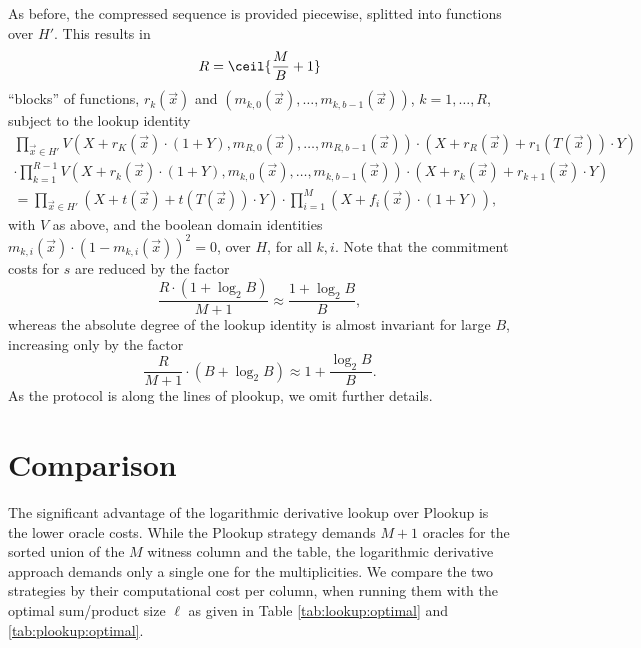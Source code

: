 \documentclass[11pt]{article}
\theoremstyle{definition}
\theoremstyle{definition}
\begin{document}
As before, the compressed sequence is provided piecewise, splitted into functions over $H'$. 
This results in
\[
R = \ceil{\frac{M}{B}+ 1} 
\]
``blocks'' of functions, $r_k(\vec x)$ and $( m_{k,0}(\vec x),\ldots,  m_{k, b-1}(\vec x))$, $k=1,\ldots, R$, subject to 
the lookup identity
\begin{multline*}
\prod_{\vec x\in H'} 
V(X +  r_K(\vec x) \cdot (1 + Y), m_{R,0}(\vec x),\ldots, m_{R,b-1}(\vec x)) \cdot (X +  r_{R}(\vec x) +  r_{1}(T(\vec x))\cdot Y)
\\
\cdot 
\prod_{k=1}^{R-1}
V(X +  r_k(\vec x) \cdot (1 + Y), m_{k,0}(\vec x),\ldots, m_{k,b-1}(\vec x)) \cdot (X +  r_{k}(\vec x) +  r_{k+1}(\vec x)\cdot Y)
\\
= \prod_{\vec x\in H'} (X + t(\vec x) + t(T(\vec x))\cdot Y) \cdot \prod_{i=1}^M (X + f_i(\vec x)\cdot (1 + Y)),
\end{multline*}
with $V$ as above, and the boolean domain identities $m_{k,i}(\vec x)\cdot (1 - m_{k,i}(\vec x))^2 = 0$,
over $H$, for all $k, i$.
Note that the commitment costs for $s$ are reduced by the factor 
\[
\frac{R\cdot (1 + \log_2 B)}{M+1} \approx \frac{1 + \log_2 B}{B},
\]
whereas the absolute degree of the lookup identity is almost invariant for large $B$, increasing only by the factor
\[
\frac{R}{M+1}\cdot (B + \log_2 B) \approx 1 + \frac{\log_2 B}{B}.
\]
As the protocol is along the lines of plookup, we omit further details.







\section{Comparison}


The significant advantage of the logarithmic derivative lookup over Plookup is the lower oracle costs.
While the Plookup strategy demands $M + 1$ oracles for the sorted union of the $M$ witness column and the table, the logarithmic derivative approach demands only a single one for the multiplicities.
We compare the two strategies by their computational cost per column, when running them with the optimal sum/product size $\ell$ as given in Table \ref{tab:lookup:optimal} and \ref{tab:plookup:optimal}.
\end{document}
